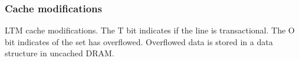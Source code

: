 
\subsubsection{Cache modifications}

%
{LTM cache modifications. The T bit indicates if the line is
transactional. The O bit indicates of the set has
overflowed. Overflowed data is stored in a data structure in uncached
DRAM.}

